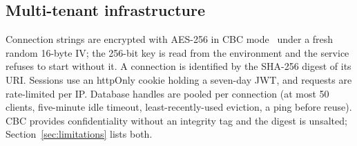 \subsection{Multi-tenant infrastructure}
Connection strings are encrypted with AES-256 in CBC mode~\cite{nist80038a} under a fresh random 16-byte IV; the 256-bit key is read from the environment and the service refuses to start without it. A connection is identified by the SHA-256 digest of its URI. Sessions use an httpOnly cookie holding a seven-day JWT, and requests are rate-limited per IP. Database handles are pooled per connection (at most 50 clients, five-minute idle timeout, least-recently-used eviction, a ping before reuse). CBC provides confidentiality without an integrity tag and the digest is unsalted; Section~\ref{sec:limitations} lists both.
